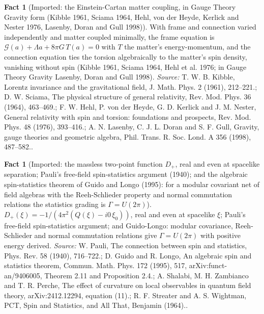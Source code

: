 \documentclass[11pt]{article}
\theoremstyle{definition}
\newtheorem{fact}[theorem]{Fact}
\theoremstyle{plain}
\begin{document}
\begin{fact}[Imported: the Einstein-Cartan matter coupling, in Gauge Theory Gravity form (Kibble 1961, Sciama 1964, Hehl, von der Heyde, Kerlick and Nester 1976, Lasenby, Doran and Gull 1998)]\label{c:synthesis.imported-einstein-cartan-matter-coupling}
With frame and connection varied independently and matter coupled minimally, the frame equation is $\mathcal{G}(a) + \Lambda a + 8\pi G\,T(a) = 0$ with $T$ the matter's energy-momentum, and the connection equation ties the torsion algebraically to the matter's spin density, vanishing without spin (Kibble 1961, Sciama 1964, Hehl et al. 1976; in Gauge Theory Gravity Lasenby, Doran and Gull 1998).
\emph{Source:} T. W. B. Kibble, Lorentz invariance and the gravitational field, J. Math. Phys. 2 (1961), 212--221.; D. W. Sciama, The physical structure of general relativity, Rev. Mod. Phys. 36 (1964), 463--469.; F. W. Hehl, P. von der Heyde, G. D. Kerlick and J. M. Nester, General relativity with spin and torsion: foundations and prospects, Rev. Mod. Phys. 48 (1976), 393--416.; A. N. Lasenby, C. J. L. Doran and S. F. Gull, Gravity, gauge theories and geometric algebra, Phil. Trans. R. Soc. Lond. A 356 (1998), 487--582..
\end{fact}

\begin{fact}[Imported: the massless two-point function $D_{+}$, real and even at spacelike separation; Pauli's free-field spin-statistics argument (1940); and the algebraic spin-statistics theorem of Guido and Longo (1995): for a modular covariant net of field algebras with the Reeh-Schlieder property and normal commutation relations the statistics grading is $\Gamma = U(2\pi)$]\label{c:synthesis.imported-free-field-spin-statistics-and-guido-longo-theorem}
$D_{+}(\xi) = -1/(4\pi^{2}(Q(\xi) - i0\,\xi_{0}))$, real and even at spacelike $\xi$; Pauli's free-field spin-statistics argument; and Guido-Longo: modular covariance, Reeh-Schlieder and normal commutation relations give $\Gamma = U(2\pi)$ with positive energy derived.
\emph{Source:} W. Pauli, The connection between spin and statistics, Phys. Rev. 58 (1940), 716--722.; D. Guido and R. Longo, An algebraic spin and statistics theorem, Commun. Math. Phys. 172 (1995), 517, arXiv:funct-an/9406005, Theorem 2.11 and Proposition 2.4.; A. Shalabi, M. H. Zambianco and T. R. Perche, The effect of curvature on local observables in quantum field theory, arXiv:2412.12294, equation (11).; R. F. Streater and A. S. Wightman, PCT, Spin and Statistics, and All That, Benjamin (1964)..
\end{fact}
\end{document}

